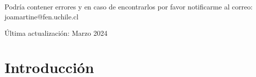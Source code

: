 \documentclass[12pt]{book}
\begin{document}
Podría contener errores y en caso de encontrarlos por favor notificarme al correo: joamartine@fen.uchile.cl

Última actualización: Marzo 2024

\newpage

\setcounter{chapter}{0}

\chapter{Introducción}


\end{document}
